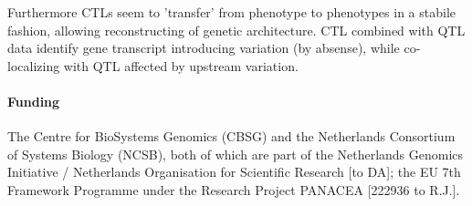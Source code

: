 \documentclass{bioinfo}
\begin{document}
  Furthermore CTLs seem to 'transfer' from phenotype to phenotypes in a stabile 
  fashion, allowing reconstructing of genetic architecture. CTL combined with QTL 
  data identify gene transcript introducing variation (by absense), while co-localizing 
  with QTL affected by upstream variation.

\paragraph{Funding\textcolon}
The Centre for BioSystems Genomics (CBSG) and the Netherlands Consortium of Systems 
Biology (NCSB), both of which are part of the Netherlands Genomics Initiative / 
Netherlands Organisation for Scientiﬁc Research [to DA]; the EU 7th Framework 
Programme under the Research Project PANACEA [222936 to R.J.].
\vspace{-0.7cm}


\end{document}
